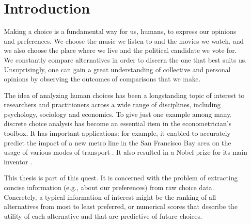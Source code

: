 \chapter{Introduction}

Making a choice is a fundamental way for us, humans, to express our opinions and preferences.
We choose the music we listen to and the movies we watch, and we also choose the place where we live and the political candidate we vote for.
We constantly compare alternatives in order to discern the one that best suits us.
Unsuprisingly, one can gain a great understanding of collective and personal opinions by observing the outcomes of comparisons that we make.

The idea of analyzing human choices has been a longstanding topic of interest to researchers and practitioners across a wide range of disciplines, including psychology, sociology and economics.
To give just one example among many, discrete choice analysis has become an essential item in the econometrician's toolbox.
It has important applications: for example, it enabled to accurately predict the impact of a new metro line in the San Francisco Bay area on the usage of various modes of transport \citep{mcfadden1977demand}.
It also resulted in a Nobel prize for its main inventor \citep{mcfadden2001economic}.

This thesis is part of this quest.
It is concerned with the problem of extracting concise information (e.g., about our preferences) from raw choice data.
Concretely, a typical information of interest might be the ranking of all alternatives from most to least preferred, or numerical scores that describe the utility of each alternative and that are predictive of future choices.

